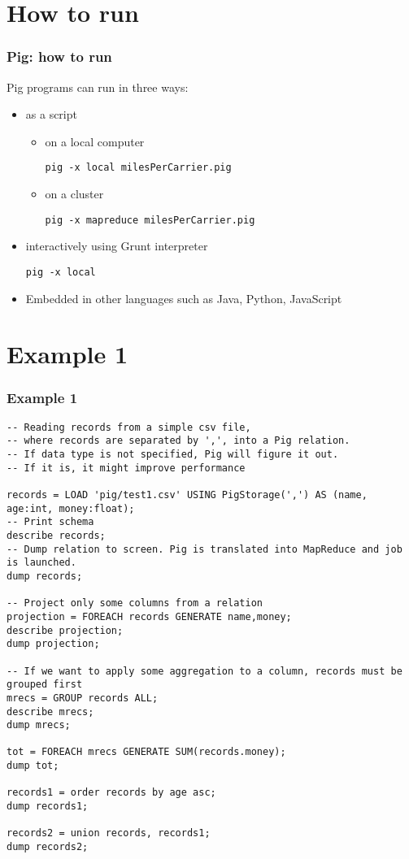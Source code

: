\documentclass{beamer}
\begin{document}
\section{How to run}
\begin{frame}[fragile]
 \frametitle{Pig: how to run}
 Pig programs can run in three ways: 
 \begin{itemize}
   \item as a script
     \begin{itemize} 
     \item on a local computer
{\color{mycolorcli}
       \begin{lstlisting}[frame=no, basicstyle=\tiny]
         pig -x local milesPerCarrier.pig
       \end{lstlisting}
}
     \item on a cluster
{\color{mycolorcli}
       \begin{lstlisting}[frame=no, basicstyle=\tiny]
         pig -x mapreduce milesPerCarrier.pig
       \end{lstlisting}
}       
     \end{itemize}
   \item interactively using Grunt interpreter
{\color{mycolorcli}
       \begin{lstlisting}[frame=no, basicstyle=\tiny]
         pig -x local
       \end{lstlisting}
}            
   \item Embedded in other languages such as Java, Python, JavaScript
 \end{itemize}
\end{frame}


\section{Example 1}
\begin{frame}[fragile]
 \frametitle{Example 1}
{\color{mycolorcode}
  \begin{lstlisting}[frame=single, basicstyle=\tiny]
-- Reading records from a simple csv file,
-- where records are separated by ',', into a Pig relation.
-- If data type is not specified, Pig will figure it out.
-- If it is, it might improve performance

records = LOAD 'pig/test1.csv' USING PigStorage(',') AS (name, age:int, money:float);
-- Print schema
describe records;
-- Dump relation to screen. Pig is translated into MapReduce and job is launched.
dump records;

-- Project only some columns from a relation
projection = FOREACH records GENERATE name,money;
describe projection;
dump projection;

-- If we want to apply some aggregation to a column, records must be grouped first
mrecs = GROUP records ALL;
describe mrecs;
dump mrecs;

tot = FOREACH mrecs GENERATE SUM(records.money);
dump tot;

records1 = order records by age asc;
dump records1;

records2 = union records, records1;
dump records2;
  \end{lstlisting}
}
\end{frame}
\end{document}
